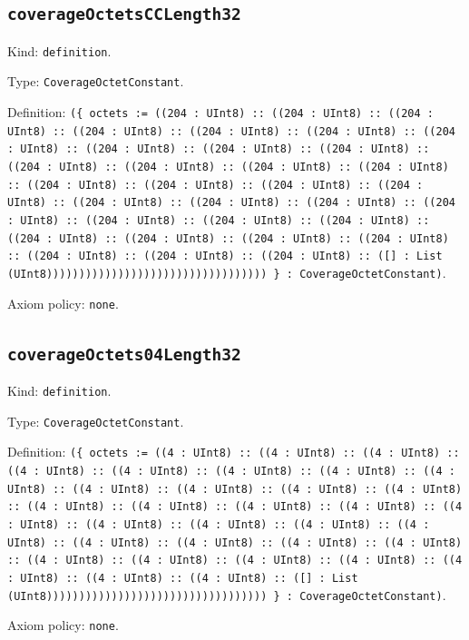 \documentclass[11pt]{article}
\begin{document}
\subsection*{\texttt{coverageOctetsCCLength32}}
\noindent Kind: \texttt{definition}.\par
\noindent Type: \texttt{CoverageOctetConstant}.\par
\noindent Definition: \texttt{(\{ octets := ((204 : UInt8) :: ((204 : UInt8) :: ((204 : UInt8) :: ((204 : UInt8) :: ((204 : UInt8) :: ((204 : UInt8) :: ((204 : UInt8) :: ((204 : UInt8) :: ((204 : UInt8) :: ((204 : UInt8) :: ((204 : UInt8) :: ((204 : UInt8) :: ((204 : UInt8) :: ((204 : UInt8) :: ((204 : UInt8) :: ((204 : UInt8) :: ((204 : UInt8) :: ((204 : UInt8) :: ((204 : UInt8) :: ((204 : UInt8) :: ((204 : UInt8) :: ((204 : UInt8) :: ((204 : UInt8) :: ((204 : UInt8) :: ((204 : UInt8) :: ((204 : UInt8) :: ((204 : UInt8) :: ((204 : UInt8) :: ((204 : UInt8) :: ((204 : UInt8) :: ((204 : UInt8) :: ((204 : UInt8) :: ([] : List (UInt8)))))))))))))))))))))))))))))))))) \} : CoverageOctetConstant)}.\par
\noindent Axiom policy: \texttt{none}.\par
\subsection*{\texttt{coverageOctets04Length32}}
\noindent Kind: \texttt{definition}.\par
\noindent Type: \texttt{CoverageOctetConstant}.\par
\noindent Definition: \texttt{(\{ octets := ((4 : UInt8) :: ((4 : UInt8) :: ((4 : UInt8) :: ((4 : UInt8) :: ((4 : UInt8) :: ((4 : UInt8) :: ((4 : UInt8) :: ((4 : UInt8) :: ((4 : UInt8) :: ((4 : UInt8) :: ((4 : UInt8) :: ((4 : UInt8) :: ((4 : UInt8) :: ((4 : UInt8) :: ((4 : UInt8) :: ((4 : UInt8) :: ((4 : UInt8) :: ((4 : UInt8) :: ((4 : UInt8) :: ((4 : UInt8) :: ((4 : UInt8) :: ((4 : UInt8) :: ((4 : UInt8) :: ((4 : UInt8) :: ((4 : UInt8) :: ((4 : UInt8) :: ((4 : UInt8) :: ((4 : UInt8) :: ((4 : UInt8) :: ((4 : UInt8) :: ((4 : UInt8) :: ((4 : UInt8) :: ([] : List (UInt8)))))))))))))))))))))))))))))))))) \} : CoverageOctetConstant)}.\par
\noindent Axiom policy: \texttt{none}.\par
\end{document}

